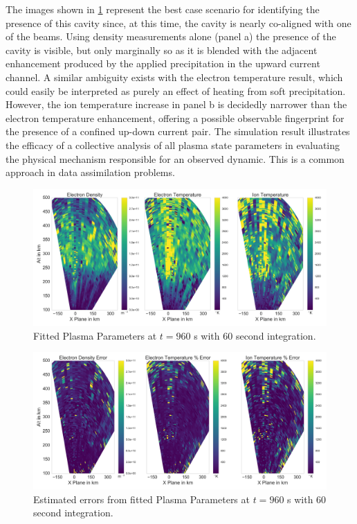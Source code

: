 \documentclass[draft,ras]{agutex}
\begin{document}
\begin{article}
The images shown in \ref{fig:fplparamst60} represent the best case scenario for identifying the presence of this cavity since, at this time, the cavity is nearly co-aligned with one of the beams. 
Using density measurements alone (panel a) the presence of the cavity is visible, but only marginally so as it is blended with the adjacent  enhancement produced by the applied precipitation in the upward current channel.  A similar ambiguity exists with the electron temperature result, which could easily be interpreted as purely an effect of heating from soft precipitation.   However, the ion temperature increase in panel b is decidedly narrower than the electron temperature enhancement, offering a possible observable fingerprint for the presence of a confined up-down current pair.  The simulation result illustrates the efficacy of a collective analysis of all plasma state parameters in evaluating the physical mechanism responsible for an observed dynamic.  This is a common approach in data assimilation problems.


\begin{figure}[!t]
\centering
\includegraphics[width=6in]{0960_60_int}
\caption{Fitted Plasma Parameters at $t=960$ s with 60 second integration.}
\label{fig:fplparamst60}
\end{figure}

\begin{figure}[!t]
\centering
\includegraphics[width=6in]{0960_60_int_err}
\caption{Estimated errors from fitted Plasma Parameters at $t=960$ s with 60 second integration.}
\label{fig:fplparamst60err}
\end{figure}

\end{article}
\end{document}
